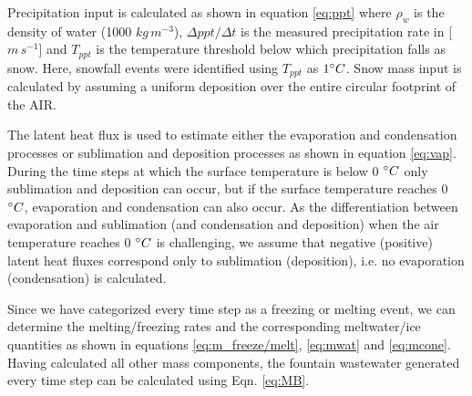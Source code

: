 Precipitation input is calculated as shown in equation \ref{eq:ppt} where $\rho_{w}$ is the density of water (1000
$kg\,m^{-3}$), $\Delta ppt/ \Delta t$ is the measured precipitation rate in [$m\,s^{-1}$] and $T_{ppt}$ is the temperature threshold
below which precipitation falls as snow. Here, snowfall events were identified using $T_{ppt}$ as $1 ^{\circ} C$. Snow
mass input is calculated by assuming a uniform deposition over the entire circular footprint of the AIR.

The latent heat flux is used to estimate either the evaporation and condensation processes or sublimation and deposition
processes as shown in equation \ref{eq:vap}. During the time steps at which the surface temperature is below 0 $^{\circ} C$ only
sublimation and deposition can occur, but if the surface temperature reaches 0 $^{\circ} C$, evaporation and condensation
can also occur. As the differentiation between evaporation and sublimation (and condensation and deposition) when the
air temperature reaches 0 $^{\circ} C$ is challenging, we assume that negative (positive) latent heat fluxes correspond
only to sublimation (deposition), i.e. no evaporation (condensation) is calculated.

Since we have categorized every time step as a freezing or melting event, we can determine the melting/freezing
rates and the corresponding meltwater/ice quantities as shown in equations \ref{eq:m_freeze/melt}, \ref{eq:mwat}
and \ref{eq:mcone}. Having calculated all other mass components, the fountain wastewater generated every
time step can be calculated using Eqn. \ref{eq:MB}.

